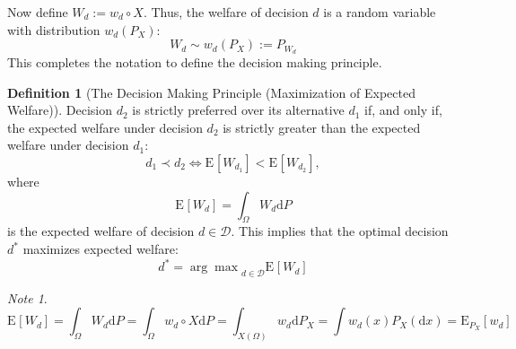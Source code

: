 \documentclass[a4paper,10pt,twoside,pagesize,abstracton]{scrartcl}
\renewcommand{\d}{\mathrm{d}\!} %
\newcommand{\E}[2][]{\mathrm{E}_{#1}\left[#2\right]} %
\theoremstyle{plain}%
\theoremstyle{definition}
\newtheorem{defn}[thm]{Definition}
\theoremstyle{remark}
\newtheorem*{note}{Note}
\begin{document}
Now define $W_d := w_d \circ X$. Thus, the welfare of decision $d$ is a random variable with distribution $w_d(P_X)$:
\begin{equation}
  W_d \sim w_d(P_X) := P_{W_d}
\end{equation}
This completes the notation to define the decision making principle.
\begin{defn}[The Decision Making Principle (Maximization of Expected Welfare)]
  Decision $d_2$ is strictly preferred over its alternative $d_1$ if, and only if, the expected welfare under decision $d_2$ is strictly greater than the expected welfare under decision $d_1$:
  \begin{equation}
    \label{eq:decisionMakingPrinciple}
  d_1 \prec d_2 \Leftrightarrow \E{W_{d_1}} < \E{W_{d_2}}, 
  \end{equation}
  where 
    \begin{equation}
    \E{W_d} = \int_\Omega W_d \d P 
  \end{equation}
  is the expected welfare of decision $d\in\mathcal{D}$. This implies that the optimal decision $d^*$ maximizes expected welfare:
  \begin{equation}
  d^* = {\arg \max}_{d\in\mathcal{D}} \E{W_d}
  \end{equation}
\end{defn}
\begin{note}
  \begin{equation}
    \E{W_d} = \int_\Omega W_d \d P = \int_\Omega w_d \circ X \d P = \int_{X(\Omega)} w_d \d P_X = \int w_d (x) P_X (\d x) = \E[P_X]{w_d}
  \end{equation}
\end{note}
\end{document}
